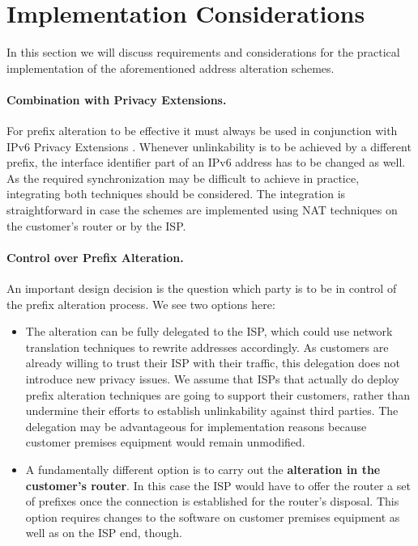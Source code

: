 \documentclass{easychair}
\begin{document}
\section{Implementation Considerations}
\label{sec:implementation}

In this section we will discuss requirements and considerations for the practical implementation of the aforementioned address alteration schemes.

\paragraph{Combination with Privacy Extensions.}

For prefix alteration to be effective it must always be used in conjunction with IPv6 Privacy Extensions \cite{RFC4941}. Whenever unlinkability is to be achieved by a different prefix, the interface identifier part of an IPv6 address has to be changed as well. As the required synchronization may be difficult to achieve in practice, integrating both techniques should be considered. The integration is straightforward in case the schemes are implemented using NAT techniques on the customer's router or by the ISP.

\paragraph{Control over Prefix Alteration.}

An important design decision is the question which party is to be in control of the prefix alteration process. We see two options here: 
\begin{itemize}
    \item The alteration can be fully delegated to the ISP, which could use network translation techniques to rewrite addresses accordingly. As customers are already willing to trust their ISP with their traffic, this delegation does not introduce new privacy issues. We assume that ISPs that actually do deploy prefix alteration techniques are going to support their customers, rather than undermine their efforts to establish unlinkability against third parties. The delegation may be advantageous for implementation reasons because customer premises equipment would remain unmodified. 
    \item A fundamentally different option  is to carry out the \textbf{alteration in the customer's router}. In this case the ISP would have to offer the router a set of prefixes once the connection is established for the router's disposal. This option requires changes to the software on customer premises equipment as well as on the ISP end, though.
\end{itemize}
\end{document}
